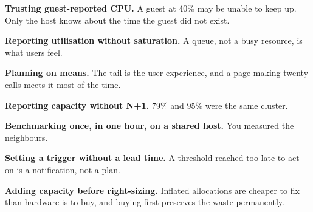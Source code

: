 \begin{pitfall}
\begin{tight}
  \item \textbf{Trusting guest-reported CPU.} A guest at 40\% may be unable to
        keep up. Only the host knows about the time the guest did not exist.
  \item \textbf{Reporting utilisation without saturation.} A queue, not a busy
        resource, is what users feel.
  \item \textbf{Planning on means.} The tail is the user experience, and a page
        making twenty calls meets it most of the time.
  \item \textbf{Reporting capacity without N+1.} 79\% and 95\% were the same
        cluster.
  \item \textbf{Benchmarking once, in one hour, on a shared host.} You measured
        the neighbours.
  \item \textbf{Setting a trigger without a lead time.} A threshold reached too
        late to act on is a notification, not a plan.
  \item \textbf{Adding capacity before right-sizing.} Inflated allocations are
        cheaper to fix than hardware is to buy, and buying first preserves the
        waste permanently.
\end{tight}
\end{pitfall}

